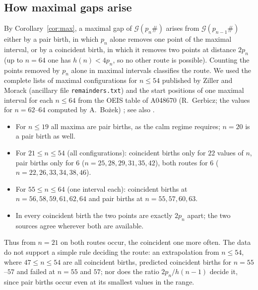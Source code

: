 \documentclass[11pt]{article}
\theoremstyle{definition}
\theoremstyle{remark}
\newcommand{\G}{\mathcal{G}}
\begin{document}
\subsection{How maximal gaps arise}\label{sec:maxima}

By Corollary~\ref{cor:max}, a maximal gap of $\G(p_n\#)$ arises from $\G(p_{n-1}\#)$ either by a pair birth, in which $p_n$ alone removes one point of the maximal interval, or by a coincident birth, in which it removes two points at distance $2p_n$ (up to $n = 64$ one has $h(n) < 4p_n$, so no other route is possible). Counting the points removed by $p_n$ alone in maximal intervals classifies the route. We used the complete lists of maximal configurations for $n \le 54$ published by Ziller and Morack \cite{ZM16} (ancillary file \texttt{remainders.txt}) and the start positions of one maximal interval for each $n \le 64$ from the OEIS table of A048670 (R.~Gerbicz; the values for $n = 62$--$64$ computed by A.~Bo\.zek) \cite{OEIS}; see also \cite{Ha09,HS12}.
\begin{itemize}
\item For $n \le 19$ all maxima are pair births, as the calm regime requires; $n = 20$ is a pair birth as well.
\item For $21 \le n \le 54$ (all configurations): coincident births only for $22$ values of $n$, pair births only for $6$ ($n = 25, 28, 29, 31, 35, 42$), both routes for $6$ ($n = 22, 26, 33, 34, 38, 46$).
\item For $55 \le n \le 64$ (one interval each): coincident births at $n = 56, 58, 59, 61, 62, 64$ and pair births at $n = 55, 57, 60, 63$.
\item In every coincident birth the two points are exactly $2p_n$ apart; the two sources agree wherever both are available.
\end{itemize}
Thus from $n = 21$ on both routes occur, the coincident one more often. The data do not support a simple rule deciding the route: an extrapolation from $n \le 54$, where $47 \le n \le 54$ are all coincident births, predicted coincident births for $n = 55$--$57$ and failed at $n = 55$ and $57$; nor does the ratio $2p_n/h(n-1)$ decide it, since pair births occur even at its smallest values in the range.
\end{document}
